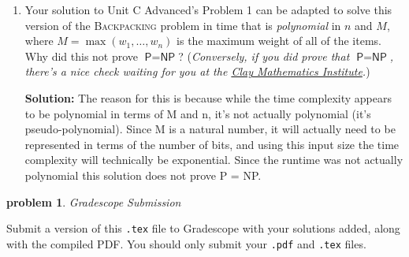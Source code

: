 \documentclass[10pt]{article}
\newcommand{\solution}[1]{\color{blue}\hfill\break\noindent\textbf{Solution:} #1\color{black}}
\newtheorem{problem}{\sc\color{cit}problem}
\begin{document}
\begin{enumerate}
  \item Your solution to Unit C Advanced's Problem 1 can be adapted to solve this version of the \textsc{Backpacking} problem
  in time that is {\em polynomial} in $n$ and $M$, where $M = \max(w_1, \ldots, w_n)$ is the maximum weight of all of the items. Why did this
  not prove $\textsf{P} = \textsf{NP}$? ({\em Conversely, if you did prove that $\textsf{P} = \textsf{NP}$, there's a nice
  check waiting for you at the \href{https://www.claymath.org/millennium-problems/p-vs-np-problem}{Clay Mathematics Institute}.})
  
  \solution{
    The reason for this is because while the time complexity appears to be polynomial in terms of M and n, it's not actually polynomial (it's pseudo-polynomial). Since M is a natural number, it will actually need to be represented in terms of the number of bits, and using this input size the time complexity will technically be exponential. Since the runtime was not actually polynomial this solution does not prove P = NP.
  }
\end{enumerate}


\begin{problem} Gradescope Submission \end{problem}
Submit a version of this \verb|.tex| file to Gradescope with your solutions added, along with the compiled PDF.  You should only submit your \verb|.pdf| and \verb|.tex| files.
\end{document}
